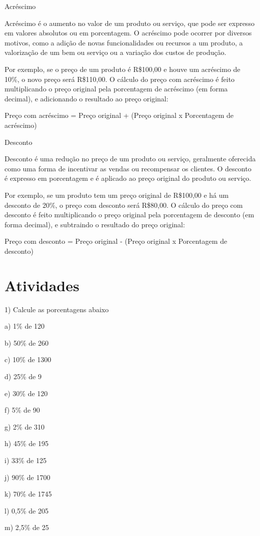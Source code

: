 Acréscimo

Acréscimo é o aumento no valor de um produto ou serviço, que pode ser
expresso em valores absolutos ou em porcentagem. O acréscimo pode
ocorrer por diversos motivos, como a adição de novas funcionalidades ou
recursos a um produto, a valorização de um bem ou serviço ou a variação
dos custos de produção.

Por exemplo, se o preço de um produto é R\$100,00 e houve um acréscimo
de 10\%, o novo preço será R\$110,00. O cálculo do preço com acréscimo é
feito multiplicando o preço original pela porcentagem de acréscimo (em
forma decimal), e adicionando o resultado ao preço original:

Preço com acréscimo = Preço original + (Preço original x Porcentagem de
acréscimo)

Desconto

Desconto é uma redução no preço de um produto ou serviço, geralmente
oferecida como uma forma de incentivar as vendas ou recompensar os
clientes. O desconto é expresso em porcentagem e é aplicado ao preço
original do produto ou serviço.

Por exemplo, se um produto tem um preço original de R\$100,00 e há um
desconto de 20\%, o preço com desconto será R\$80,00. O cálculo do preço
com desconto é feito multiplicando o preço original pela porcentagem de
desconto (em forma decimal), e subtraindo o resultado do preço original:

Preço com desconto = Preço original - (Preço original x Porcentagem de
desconto)

\section{Atividades}

1) Calcule as porcentagens abaixo

a) 1\% de 120

b) 50\% de 260

c) 10\% de 1300

d) 25\% de 9

e) 30\% de 120

f) 5\% de 90

g) 2\% de 310

h) 45\% de 195

i) 33\% de 125

j) 90\% de 1700

k) 70\% de 1745

l) 0,5\% de 205

m) 2,5\% de 25

